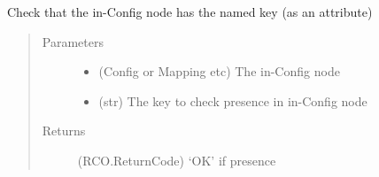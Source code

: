 \documentclass[a4paper,10pt,english]{sphinxmanual}
\begin{document}
\begin{fulllineitems}
\label{\detokenize{apidoc_src/src:src.utilsSat.check_has_key}}
Check that the in-Config node has the named key (as an attribute)
\begin{quote}\begin{description}
\item[{Parameters}] \leavevmode\begin{itemize}
\item {} 
 \textendash{} (Config or Mapping etc) The in-Config node

\item {} 
 \textendash{} (str) The key to check presence in in-Config node

\end{itemize}

\item[{Returns}] \leavevmode
(RCO.ReturnCode) ‘OK’ if presence

\end{description}\end{quote}

\end{fulllineitems}


\begin{fulllineitems}
\label{\detokenize{apidoc_src/src:src.utilsSat.config_has_application}}
\end{fulllineitems}


\begin{fulllineitems}
\label{\detokenize{apidoc_src/src:src.utilsSat.critical}}
\end{fulllineitems}


\begin{fulllineitems}
\label{\detokenize{apidoc_src/src:src.utilsSat.cyan}}
\end{fulllineitems}
\end{document}
